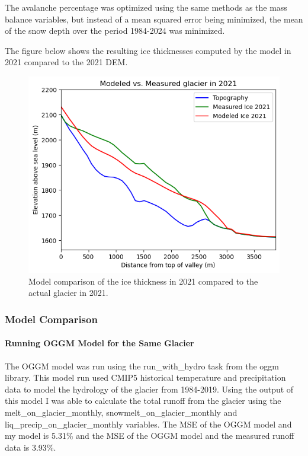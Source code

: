 \documentclass{article}
\begin{document}
The avalanche percentage was optimized using the same methods as the mass balance variables, but instead of a mean squared error being 
minimized, the mean of the snow depth over the period 1984-2024 was minimized.

The figure below shows the resulting ice thicknesses computed by the model in 2021 compared to the 2021 DEM.
\begin{figure}[h!]
    \centering
    \includegraphics[width=\textwidth]{Plots/2021_glacier_comparison.png}
    \caption{Model comparison of the ice thickness in 2021 compared to the actual glacier in 2021.}
    \label{fig:2021_glacier_comparison}
\end{figure}

\subsubsection{Model Comparison}
\paragraph{Running OGGM Model for the Same Glacier}

The OGGM model was run using the run\_with\_hydro task from the oggm library. This model run used CMIP5 historical temperature and 
precipitation data to model the hydrology of the glacier from 1984-2019. Using the output of this model I was able to calculate the total 
runoff from the glacier using the melt\_on\_glacier\_monthly, snowmelt\_on\_glacier\_monthly and liq\_precip\_on\_glacier\_monthly variables. 
The MSE of the OGGM model and my model is 5.31\% and the MSE of the OGGM model and the measured runoff data is 3.93\%.
\end{document}
